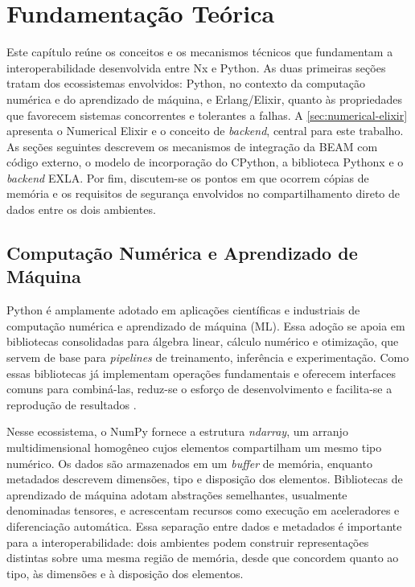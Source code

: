 
\chapter{Fundamentação Teórica}\label{cap:fundamentacao}

Este capítulo reúne os conceitos e os mecanismos técnicos que fundamentam a interoperabilidade desenvolvida entre \gls{Nx} e Python. As duas primeiras seções tratam dos ecossistemas envolvidos: Python, no contexto da computação numérica e do aprendizado de máquina, e Erlang/Elixir, quanto às propriedades que favorecem sistemas concorrentes e tolerantes a falhas. A \autoref{sec:numerical-elixir} apresenta o Numerical Elixir e o conceito de \textit{backend}, central para este trabalho. As seções seguintes descrevem os mecanismos de integração da \gls{BEAM} com código externo, o modelo de incorporação do CPython, a biblioteca Pythonx e o \textit{backend} \gls{EXLA}. Por fim, discutem-se os pontos em que ocorrem cópias de memória e os requisitos de segurança envolvidos no compartilhamento direto de dados entre os dois ambientes.

\section{Computação Numérica e Aprendizado de Máquina}\label{sec:computacao-numerica}

Python é amplamente adotado em aplicações científicas e industriais de computação numérica e aprendizado de máquina (\gls{ML}). Essa adoção se apoia em bibliotecas consolidadas para álgebra linear, cálculo numérico e otimização, que servem de base para \textit{pipelines} de treinamento, inferência e experimentação. Como essas bibliotecas já implementam operações fundamentais e oferecem interfaces comuns para combiná-las, reduz-se o esforço de desenvolvimento e facilita-se a reprodução de resultados \citep{harris2020}.

Nesse ecossistema, o NumPy fornece a estrutura \textit{ndarray}, um arranjo multidimensional homogêneo cujos elementos compartilham um mesmo tipo numérico. Os dados são armazenados em um \textit{buffer} de memória, enquanto metadados descrevem dimensões, tipo e disposição dos elementos. Bibliotecas de aprendizado de máquina adotam abstrações semelhantes, usualmente denominadas tensores, e acrescentam recursos como execução em aceleradores e diferenciação automática. Essa separação entre dados e metadados é importante para a interoperabilidade: dois ambientes podem construir representações distintas sobre uma mesma região de memória, desde que concordem quanto ao tipo, às dimensões e à disposição dos elementos.

